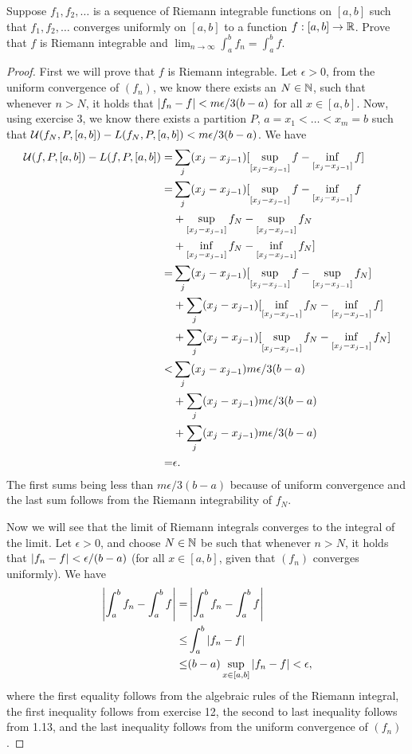 \begin{exercise}{14}
Suppose $f_1, f_2,\dots$ is a sequence of Riemann integrable functions on $[a,b]$ such that $f_1,f_2,\dots$ converges uniformly on $[a,b]$ to a function $f:[a,b]\to\mathbb{R}$.
Prove that $f$ is Riemann integrable and $\lim_{n\to\infty}\int_a^b f_n = \int_a^b f$.
\end{exercise}
\begin{proof}
First we will prove that $f$ is Riemann integrable.
Let $\epsilon>0$, from the uniform convergence of $(f_n)$, we know there exists an $N\in\mathbb{N}$, such that whenever $n>N$, it holds that $\left\lvert f_n-f\right\rvert<m\epsilon/3(b-a)$ for all $x\in [a,b]$.
Now, using exercise 3, we know there exists a partition $P$, $a=x_1<\dots<x_m=b$ such that $\mathcal{U}(f_N,P,[a,b])-L(f_N,P,[a,b])<m\epsilon/3(b-a)$.
We have
\begin{align*}
    \mathcal{U}(f,P,[a,b]) - L(f,P,[a,b])
    =&  \sum_j (x_j-x_{j-1})[\sup_{[x_j-x_{j-1}]} f - \inf_{[x_j-x_{j-1}]}f]\\
    =&  \sum_j (x_j-x_{j-1})
    [\sup_{[x_j-x_{j-1}]} f - \inf_{[x_j-x_{j-1}]}f\\
    &+ \sup_{[x_j-x_{j-1}]} f_N - \sup_{[x_j-x_{j-1}]}f_N\\
    &+ \inf_{[x_j-x_{j-1}]} f_N - \inf_{[x_j-x_{j-1}]}f_N]\\
    =&  \sum_j (x_j-x_{j-1})
    [\sup_{[x_j-x_{j-1}]} f - \sup_{[x_j-x_{j-1}]}f_N] \\
    &+ \sum_j (x_j-x_{j-1}) 
    [\inf_{[x_j-x_{j-1}]} f_N - \inf_{[x_j-x_{j-1}]}f] \\
    &+ \sum_j (x_j-x_{j-1})
    [\sup_{[x_j-x_{j-1}]} f_N - \inf_{[x_j-x_{j-1}]}f_N]\\
    <& \sum_j (x_j-x_{j-1}) m\epsilon/3(b-a)\\
    &+ \sum_j (x_j-x_{j-1}) m\epsilon/3(b-a)\\
    &+ \sum_j (x_j-x_{j-1}) m\epsilon/3(b-a)\\
    =& \epsilon.
\end{align*}
The first sums being less than $m\epsilon/3(b-a)$ because of uniform convergence and the last sum follows from the Riemann integrability of $f_N$.

Now we will see that the limit of Riemann integrals converges to the integral of the limit.
Let $\epsilon>0$, and choose $N\in\mathbb{N}$ be such that whenever $n>N$, it holds that $\left\lvert f_n - f\right\rvert < \epsilon/(b-a)$ (for all $x\in[a,b]$, given that $(f_n)$ converges uniformly).
We have
\begin{align*}
    \left\lvert \int_a^b f_n - \int_a^b f\right\rvert
    =& \left\lvert \int_a^b f_n - \int_a^b f\right\rvert\\
    \leq& \int_a^b \left\lvert f_n - f\right\rvert\\
    \leq& (b-a)\sup_{x\in[a,b]}\left\lvert f_n - f\right\rvert 
    < \epsilon,
\end{align*}
where the first equality follows from the algebraic rules of the Riemann integral, the first inequality follows from exercise 12, the second to last inequality follows from 1.13, and the last inequality follows from the uniform convergence of $(f_n)$.
\end{proof} 
